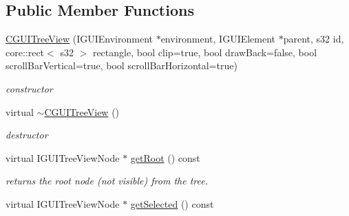 \subsection*{Public Member Functions}
\begin{DoxyCompactItemize}
\item 
\hypertarget{classirr_1_1gui_1_1_c_g_u_i_tree_view_a451ea854a62f01e314e87fa4d551e3fe}{\hyperlink{classirr_1_1gui_1_1_c_g_u_i_tree_view_a451ea854a62f01e314e87fa4d551e3fe}{C\-G\-U\-I\-Tree\-View} (I\-G\-U\-I\-Environment $\ast$environment, I\-G\-U\-I\-Element $\ast$parent, s32 id, core\-::rect$<$ s32 $>$ rectangle, bool clip=true, bool draw\-Back=false, bool scroll\-Bar\-Vertical=true, bool scroll\-Bar\-Horizontal=true)}\label{classirr_1_1gui_1_1_c_g_u_i_tree_view_a451ea854a62f01e314e87fa4d551e3fe}

\begin{DoxyCompactList}\small\item\em constructor \end{DoxyCompactList}\item 
\hypertarget{classirr_1_1gui_1_1_c_g_u_i_tree_view_a75c5b33ed4f3a8902b6289691a5953c4}{virtual \hyperlink{classirr_1_1gui_1_1_c_g_u_i_tree_view_a75c5b33ed4f3a8902b6289691a5953c4}{$\sim$\-C\-G\-U\-I\-Tree\-View} ()}\label{classirr_1_1gui_1_1_c_g_u_i_tree_view_a75c5b33ed4f3a8902b6289691a5953c4}

\begin{DoxyCompactList}\small\item\em destructor \end{DoxyCompactList}\item 
\hypertarget{classirr_1_1gui_1_1_c_g_u_i_tree_view_abaac4431b01b9365b4c6eed452a47afc}{virtual I\-G\-U\-I\-Tree\-View\-Node $\ast$ \hyperlink{classirr_1_1gui_1_1_c_g_u_i_tree_view_abaac4431b01b9365b4c6eed452a47afc}{get\-Root} () const }\label{classirr_1_1gui_1_1_c_g_u_i_tree_view_abaac4431b01b9365b4c6eed452a47afc}

\begin{DoxyCompactList}\small\item\em returns the root node (not visible) from the tree. \end{DoxyCompactList}\item 
\hypertarget{classirr_1_1gui_1_1_c_g_u_i_tree_view_a1afec54f7064402f5d86143cb604c970}{virtual I\-G\-U\-I\-Tree\-View\-Node $\ast$ \hyperlink{classirr_1_1gui_1_1_c_g_u_i_tree_view_a1afec54f7064402f5d86143cb604c970}{get\-Selected} () const }\label{classirr_1_1gui_1_1_c_g_u_i_tree_view_a1afec54f7064402f5d86143cb604c970}


\end{DoxyCompactItemize}
